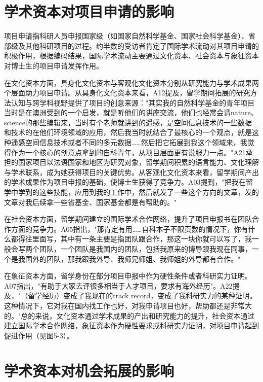 
\section{学术资本对项目申请的影响}

项目申请指科研人员申报国家级（如国家自然科学基金、国家社会科学基金）、省部级及其他科研项目的过程。约半数的受访者肯定了国际学术流动对其项目申请的积极作用，根据编码结果，国际学术流动主要通过文化资本、社会资本与象征资本对博士生的项目申请发挥作用。

在文化资本方面，具身化文化资本与客观化文化资本分别从研究能力与学术成果两个层面助力项目申请。从具身化文化资本来看，A12提及，留学期间拓展的研究方法认知与跨学科视野提供了项目的创意来源："其实我的自然科学基金的青年项目当时是在澳洲受到的一个启发，就是听他们的讲座交流，他们也经常会请nature、science的那些编辑来，当时有个老师就讲到的遥感，是空间信息技术的一些数据和技术的在他们环境领域的应用，然后我当时就结合了最核心的一个观点，就是这种遥感空间信息技术或者不同的多元数据……然后把它拓展到我这个领域来，我觉得作为一个核心的创意点拿到的自科青年，从项目层面更有说服力一点。"A21承担的国家项目以法语国家和地区为研究对象，留学期间积累的语言能力、文化理解与学术联系，成为她获得项目的关键优势。从客观化文化资本来看，留学期间产出的学术成果作为项目申报的基础，使博士生获得了竞争力。A03提到，"把我在留学中学到的这些技能，应用到我的工作中，然后就发了一些这个方向的文章，发的文章对我后续拿一些省基金、国家基金都是有帮助的。"

在社会资本方面，留学期间建立的国际学术合作网络，提升了项目申报书在团队合作方面的竞争力。A05指出，"那肯定有用……自科本子不限页数的情况下，你有什么都得往里面写，其中有一条主要是指团队跟合作，那这一块你就可以写了，我一般会写两个团队，一个团队是我国内的团队，包括我原来的博导跟我现在同事，一个是我国外的团队，那我跟我外导、我师兄师姐、我师姐的外导都有合作。"

在象征资本方面，留学身份在部分项目申报中作为硬性条件或者科研实力证明。A07指出，"有助于大家去评很多相当于人才项目，要求有海外经历"。A22提及，"（留学经历）变成了我现在的track record，变成了我科研实力的某种证明。这种情况下，它对我在国内找工作也好，对我申请项目也好，帮助都还是非常大的。"总的来说，文化资本通过学术成果的产出和研究能力的提升，社会资本通过建立国际学术合作网络，象征资本作为硬性要求或科研实力证明，对项目申请起到促进作用（见图5-3）。


\section{学术资本对机会拓展的影响}

